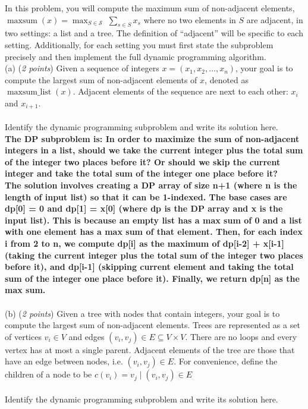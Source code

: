 \documentclass{hw_template}
\begin{document}

\begin{problem}
In this problem, you will compute the maximum sum of non-adjacent elements,
$\operatorname{maxsum}(x)
= \max_{S \in \mathcal{S}} \; \sum_{s \in S} x_s$
where no two elements in \(S\) are adjacent, in two settings: a list and a tree. The definition of
“adjacent” will be specific to each setting. Additionally, for each setting you must first state
the subproblem precisely and then implement the full dynamic programming algorithm.\\


(a) (\textit{2 points})
Given a sequence of integers $x = (x_1, x_2, \ldots, x_n)$,
your goal is to compute the largest sum of non-adjacent elements of \(x\), denoted as
\(\operatorname{maxsum\_list}(x)\).
Adjacent elements of the sequence are next to each other: \(x_i\) and \(x_{i+1}\). \\\\
Identify the dynamic programming subproblem and write its solution here.\\

\textbf{The DP subproblem is: In order to maximize the sum of non-adjacent integers in a list, should we 
take the current integer plus the total sum of the integer two places before it? Or should we
skip the current integer and take the total sum of the integer one place before it?}\\

\textbf{The solution involves creating a DP array of size n+1 (where n is the length of input list) so 
that it can be 1-indexed. The base cases are dp[0] = 0 and dp[1] = x[0] (where dp is the DP array and x is the input list).
This is because an empty list has a max sum of 0 and a list with one element has a max sum of that element.
Then, for each index i from 2 to n, we compute dp[i] as the maximum of  dp[i-2] + x[i-1] 
(taking the current integer plus the total sum of the integer two places before it), and dp[i-1] 
(skipping current element and taking the total sum of the integer one place before it).
Finally, we return dp[n] as the max sum.}\\\\

(b) (\textit{2 points})
Given a tree with nodes that contain integers, your goal is to compute the largest sum
of non-adjacent elements. Trees are represented as a set of vertices
$v_i \in V$ and edges $(v_i, v_j) \in E \subseteq V \times V$.
There are no loops and every vertex has at most a single parent.
Adjacent elements of the tree are those that have an edge between nodes, i.e. $(v_i, v_j) \in E$.
For convenience, define the children of a node to be
$c(v_i) = { v_j \mid (v_i, v_j) \in E }$\\\\
Identify the dynamic programming subproblem and write its solution here.\\\\


\end{problem}
\end{document}
